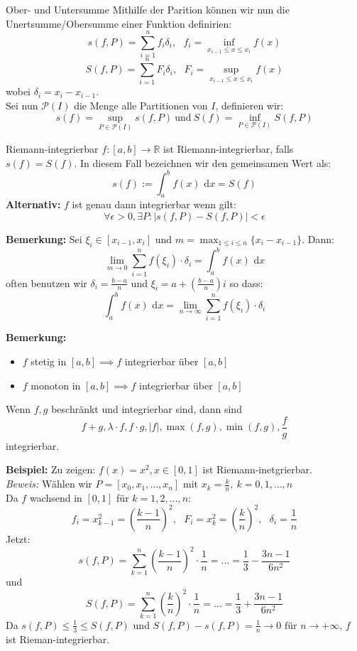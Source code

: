 \documentclass[a4paper,8pt]{extarticle}
\newenvironment{bemerkung}{
   \noindent \textbf{Bemerkung:  }}{}
\def\R{\mathbb{R}}
\def\dx{\text{ d}x}
\begin{document}
\begin{subbox}{Ober- und Untersumme}
 Mithilfe der Parition können wir nun die Unertsumme/Obersumme einer Funktion definirien:
 $$s(f, P) = \sum_{i = 1}^n f_i \delta_i, \ \ \ f_i = \inf_{x_{i - 1} \leq x \leq x_i} f(x)$$
 $$S(f, P) = \sum_{i = 1}^n F_i \delta_i, \ \ \ F_i = \sup_{x_{i - 1} \leq x \leq x_i} f(x)$$
 wobei $\delta_i = x_i - x_{i-1}$. \\
 Sei nun $\mathcal{P}(I)$ die Menge alle Partitionen von $I$, definieren wir:
 $$s(f) = \sup_{P \in \mathcal{P}(I)} s(f, P) \ \text{und} \ S(f) = \inf_{P \in \mathcal{P}(I)} S(f, P)$$
\end{subbox}

\begin{mainbox}{Riemann-integrierbar}
 $f:[a,b] \to \R$ ist Riemann-integrierbar, falls $s(f) = S(f)$. In diesem Fall bezeichnen wir den gemeinsamen Wert als: $$s(f) := \int_a^b f(x)\dx = S(f)$$
 \textbf{Alternativ:} $f$ ist genau dann integrierbar wenn gilt: $$\forall \epsilon > 0, \exists P : |s(f, P) - S(f, P)| < \epsilon$$
\end{mainbox}

\begin{bemerkung}
  Sei $\xi_i \in [x_{i-1}, x_i]$ und $m = \max_{1 \leq i \leq n}\{x_i - x_{i-1}\}$. Dann:
  $$\lim_{m \to 0} \sum_{i = 1}^n f(\xi_i) \cdot \delta_i = \int_a^b f(x) \dx$$
  often benutzen wir $\delta_i = \frac{b- a}{n}$ und $\xi_i = a + \left(\frac{b-a}{n}\right)i$ so dass:
  $$\int_a^b f(x) \dx = \lim_{n \to \infty} \sum_{i = 1}^n f(\xi_i) \cdot \delta_i$$
\end{bemerkung}

\begin{bemerkung}
\begin{itemize}
 \item $f$ stetig in $[a,b] \implies f$ integrierbar über $[a,b]$
 \item $f$ monoton in $[a,b] \implies f$ integrierbar über $[a,b]$
\end{itemize}
\end{bemerkung}

\begin{subbox}{}
 Wenn $f,g$ beschränkt und integrierbar sind, dann sind
 $$f+g, \lambda \cdot f, f \cdot g, |f|, \max(f,g), \min(f,g), \frac{f}{g}$$ integrierbar.
\end{subbox}

\noindent \textbf{Beispiel:} Zu zeigen: $f(x) = x^2, x \in [0, 1]$ ist Riemann-inetgrierbar. \\
\textit{Beweis:} Wählen wir $P = [x_0, x_1, \ldots, x_n]$ mit $x_k = \frac{k}{n}, \ k = 0, 1, \ldots, n$ \\
Da $f$ wachsend in $[0, 1]$ für $k = 1, 2, \ldots, n$: 
$$f_i = x_{k-1}^2 = \left(\frac{k-1}{n}\right)^2, \ \ \ F_i = x_k^2 = \left(\frac{k}{n}\right)^2, \ \ \ \delta_i = \frac{1}{n}$$
Jetzt: 
$$s(f, P) = \sum_{k = 1}^n \left(\frac{k-1}{n}\right)^2 \cdot \frac{1}{n} = \ldots = \frac{1}{3} - \frac{3n-1}{6n^2}$$
und $$S(f, P) = \sum_{k = 1}^n \left(\frac{k}{n}\right)^2 \cdot \frac{1}{n} = \ldots = \frac{1}{3} + \frac{3n-1}{6n^2}$$
Da $s(f, P) \leq \frac{1}{3} \leq S(f, P)$ und $S(f, P) - s(f, P) = \frac{1}{n} \to 0 \text{ für } n \to +\infty$, $f$ ist Rieman-integrierbar.
\end{document}
